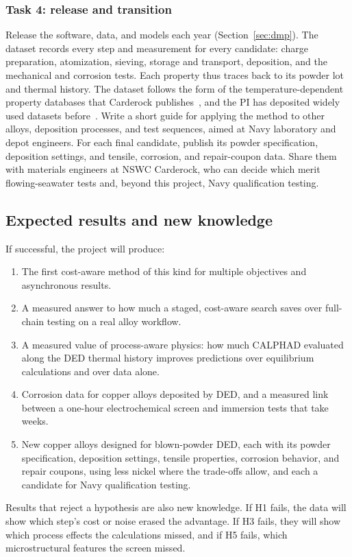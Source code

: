 \documentclass[12pt,letterpaper]{article}
\begin{document}
\subsubsection{Task 4: release and transition}
Release the software, data, and models each year (Section~\ref{sec:dmp}).
The dataset records every step and measurement for every candidate: charge preparation, atomization, sieving, storage and transport, deposition, and the mechanical and corrosion tests.
Each property thus traces back to its powder lot and thermal history.
The dataset follows the form of the temperature-dependent property databases that Carderock publishes~\cite{orzolek2023,norkett2025}, and the PI has deposited widely used datasets before~\cite{mptimesplit,baird2024}.
Write a short guide for applying the method to other alloys, deposition processes, and test sequences, aimed at Navy laboratory and depot engineers.
For each final candidate, publish its powder specification, deposition settings, and tensile, corrosion, and repair-coupon data.
Share them with materials engineers at NSWC Carderock, who can decide which merit flowing-seawater tests and, beyond this project, Navy qualification testing.

\subsection{Expected results and new knowledge}

If successful, the project will produce:
\begin{enumerate}\setlength{\itemsep}{0pt}
\item The first cost-aware method of this kind for multiple objectives and
asynchronous results.
\item A measured answer to how much a staged, cost-aware search saves over
full-chain testing on a real alloy workflow.
\item A measured value of process-aware physics: how much CALPHAD evaluated
along the DED thermal history improves predictions over equilibrium
calculations and over data alone.
\item Corrosion data for copper alloys deposited by DED, and a measured link
between a one-hour electrochemical screen and immersion tests that take
weeks.
\item New copper alloys designed for blown-powder DED, each with
its powder specification, deposition settings, tensile properties, corrosion
behavior, and repair coupons, using less nickel where the trade-offs allow,
and each a candidate for Navy qualification testing.
\end{enumerate}
Results that reject a hypothesis are also new knowledge.
If H1 fails, the data will show which step's cost or noise erased the advantage.
If H3 fails, they will show which process effects the calculations missed, and if H5 fails, which microstructural features the screen missed.
\end{document}
